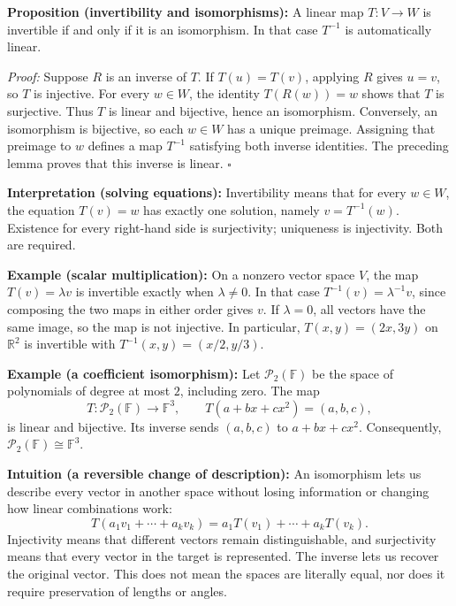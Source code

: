 \documentclass[a4paper,11pt,abstract=true]{scrartcl}
\theoremstyle{dotlessP}
\theoremstyle{dotlessS}
\theoremstyle{remark}
\theoremstyle{definition}
\begin{document}
\begin{claim_box}
\textbf{Proposition (invertibility and isomorphisms):} A linear
map $T:V\longrightarrow W$ is invertible if and only if it is an
isomorphism. In that case $T^{-1}$ is automatically linear.

\textit{Proof:} Suppose $R$ is an inverse of $T$. If $T(u)=T(v)$,
applying $R$ gives $u=v$, so $T$ is injective. For every $w\in W$,
the identity $T(R(w))=w$ shows that $T$ is surjective. Thus $T$ is
linear and bijective, hence an isomorphism.
Conversely, an isomorphism is bijective, so each $w\in W$ has a unique
preimage. Assigning that preimage to $w$ defines a map $T^{-1}$
satisfying both inverse identities. The preceding lemma proves that
this inverse is linear. \hfill$\square$
\end{claim_box}

\begin{claim_box}
\textbf{Interpretation (solving equations):} Invertibility means
that for every $w\in W$, the equation $T(v)=w$ has exactly one solution,
namely $v=T^{-1}(w)$. Existence for every right-hand side is surjectivity;
uniqueness is injectivity. Both are required.
\end{claim_box}

\begin{example_box}
\textbf{Example (scalar multiplication):} On a nonzero vector
space $V$, the map $T(v)=\lambda v$ is invertible exactly when
$\lambda\neq0$. In that case $T^{-1}(v)=\lambda^{-1}v$, since composing
the two maps in either order gives $v$. If $\lambda=0$, all vectors
have the same image, so the map is not injective. In particular,
$T(x,y)=(2x,3y)$ on $\mathbb{R}^2$ is invertible with
$T^{-1}(x,y)=(x/2,y/3)$.
\end{example_box}

\begin{example_box}
\textbf{Example (a coefficient isomorphism):} Let
$\mathcal{P}_2(\mathbb{F})$ be the space of polynomials of degree at most
$2$, including zero. The map
\[
T:\mathcal{P}_2(\mathbb{F})\longrightarrow\mathbb{F}^3,
\qquad T(a+bx+cx^2)=(a,b,c),
\]
is linear and bijective. Its inverse sends $(a,b,c)$ to $a+bx+cx^2$.
Consequently, $\mathcal{P}_2(\mathbb{F})\cong\mathbb{F}^3$.
\end{example_box}

\begin{claim_box}
\textbf{Intuition (a reversible change of description):} An
isomorphism lets us describe every vector in another space without losing
information or changing how linear combinations work:
\[
T(a_1v_1+\cdots+a_k v_k)=a_1T(v_1)+\cdots+a_k T(v_k).
\]
Injectivity means that different vectors remain distinguishable, and
surjectivity means that every vector in the target is represented.
The inverse lets us recover the original vector. This does not mean the
spaces are literally equal, nor does it require preservation of lengths
or angles.
\end{claim_box}
\end{document}
